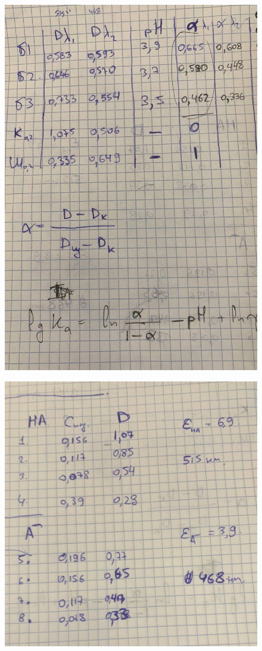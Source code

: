 \documentclass[a4paper, 12pt]{article}
\begin{document}
\begin{figure}[h!]
    \centering
    \includegraphics[width=150mm]{step2.jpg}
    \caption{}
\end{figure}
\begin{figure}[h!]
    \centering
    \includegraphics[width=150mm]{step3.jpg}
    \caption{}
\end{figure}
\end{document}
